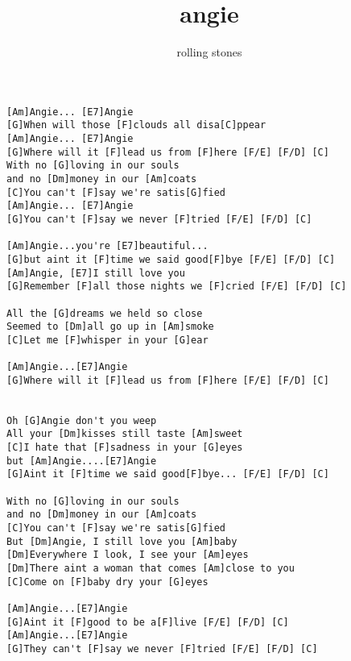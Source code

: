 \author{rolling stones}
\title{angie}
\maketitle
\begin{verbatim}
[Am]Angie... [E7]Angie
[G]When will those [F]clouds all disa[C]ppear
[Am]Angie... [E7]Angie
[G]Where will it [F]lead us from [F]here [F/E] [F/D] [C]
With no [G]loving in our souls
and no [Dm]money in our [Am]coats
[C]You can't [F]say we're satis[G]fied
[Am]Angie... [E7]Angie
[G]You can't [F]say we never [F]tried [F/E] [F/D] [C]

[Am]Angie...you're [E7]beautiful...
[G]but aint it [F]time we said good[F]bye [F/E] [F/D] [C]
[Am]Angie, [E7]I still love you
[G]Remember [F]all those nights we [F]cried [F/E] [F/D] [C]

All the [G]dreams we held so close
Seemed to [Dm]all go up in [Am]smoke
[C]Let me [F]whisper in your [G]ear

[Am]Angie...[E7]Angie
[G]Where will it [F]lead us from [F]here [F/E] [F/D] [C]

         
Oh [G]Angie don't you weep
All your [Dm]kisses still taste [Am]sweet
[C]I hate that [F]sadness in your [G]eyes
but [Am]Angie....[E7]Angie
[G]Aint it [F]time we said good[F]bye... [F/E] [F/D] [C]

With no [G]loving in our souls
and no [Dm]money in our [Am]coats
[C]You can't [F]say we're satis[G]fied
But [Dm]Angie, I still love you [Am]baby
[Dm]Everywhere I look, I see your [Am]eyes
[Dm]There aint a woman that comes [Am]close to you
[C]Come on [F]baby dry your [G]eyes

[Am]Angie...[E7]Angie
[G]Aint it [F]good to be a[F]live [F/E] [F/D] [C]
[Am]Angie...[E7]Angie
[G]They can't [F]say we never [F]tried [F/E] [F/D] [C]
\end{verbatim}